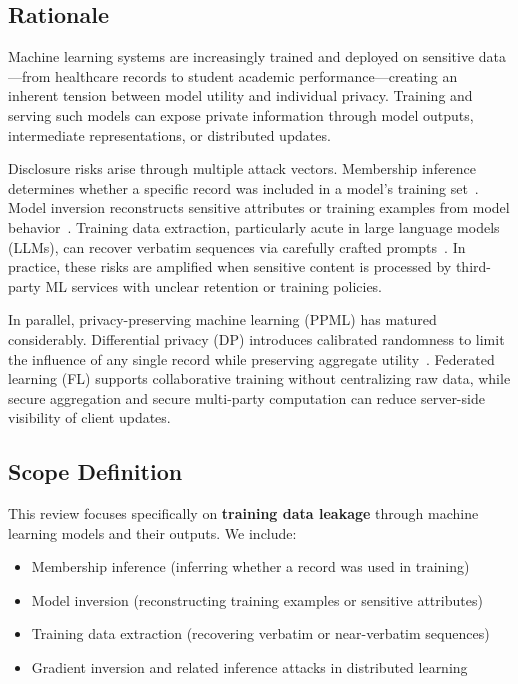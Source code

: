 \documentclass[conference]{IEEEtran}
\begin{document}
\subsection{Rationale}
Machine learning systems are increasingly trained and deployed on sensitive data---from healthcare records to student academic performance---creating an inherent tension between model utility and individual privacy. Training and serving such models can expose private information through model outputs, intermediate representations, or distributed updates.

Disclosure risks arise through multiple attack vectors. Membership inference determines whether a specific record was included in a model's training set~\cite{shokri2017membership}. Model inversion reconstructs sensitive attributes or training examples from model behavior~\cite{fredrikson2015model}. Training data extraction, particularly acute in large language models (LLMs), can recover verbatim sequences via carefully crafted prompts~\cite{carlini2021extracting}. In practice, these risks are amplified when sensitive content is processed by third-party ML services with unclear retention or training policies.

In parallel, privacy-preserving machine learning (PPML) has matured considerably. Differential privacy (DP) introduces calibrated randomness to limit the influence of any single record while preserving aggregate utility~\cite{abadi2016deep}. Federated learning (FL) supports collaborative training without centralizing raw data, while secure aggregation and secure multi-party computation can reduce server-side visibility of client updates.

\subsection{Scope Definition}
This review focuses specifically on \textbf{training data leakage} through machine learning models and their outputs. We include:
\begin{itemize}
  \item Membership inference (inferring whether a record was used in training)
  \item Model inversion (reconstructing training examples or sensitive attributes)
  \item Training data extraction (recovering verbatim or near-verbatim sequences)
  \item Gradient inversion and related inference attacks in distributed learning
\end{itemize}
\end{document}
